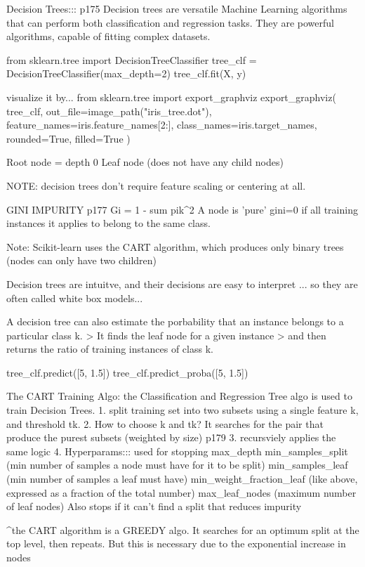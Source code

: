 Decision Trees::: p175
Decision trees are versatile Machine Learning algorithms
that can perform both classification and regression tasks.
They are powerful algorithms, capable of fitting complex datasets.

from sklearn.tree import DecisionTreeClassifier
tree_clf = DecisionTreeClassifier(max_depth=2)
tree_clf.fit(X, y)

visualize it by...
from sklearn.tree import export_graphviz
export_graphviz(
    tree_clf,
    out_file=image_path("iris_tree.dot"),
    feature_names=iris.feature_names[2:],
    class_names=iris.target_names,
    rounded=True,
    filled=True
)

Root node = depth 0
Leaf node (does not have any child nodes)

NOTE:
decision trees don't require feature scaling or centering at all.

GINI IMPURITY
p177
Gi = 1 - sum pik^2
A node is 'pure' gini=0
if all training instances it applies to belong to the same class.

Note:
Scikit-learn uses the CART algorithm,
which produces only binary trees (nodes can only have two children)

Decision trees are intuitve,
and their decisions are easy to interpret
... so they are often called white box models...

A decision tree can also estimate the porbability
that an instance belongs to a particular class k.
> It finds the leaf node for a given instance
> and then returns the ratio of training instances of class k.

tree_clf.predict([5, 1.5]) 
tree_clf.predict_proba([5, 1.5])

The CART Training Algo:
the Classification and Regression Tree algo is used to train Decision Trees.
1. split training set into two subsets using a single feature k, and threshold tk.
2. How to choose k and tk?
It searches for the pair that produce the purest subsets (weighted by size)
p179
3. recursviely applies the same logic
4. Hyperparams::: used for stopping
max_depth
min_samples_split (min number of samples a node must have for it to be split)
min_samples_leaf (min number of samples a leaf must have)
min_weight_fraction_leaf (like above, expressed as a fraction of the total number)
max_leaf_nodes (maximum number of leaf nodes)
Also stops if it can't find a split that reduces impurity

^the CART algorithm is a GREEDY algo.
It searches for an optimum split at the top level, then repeats.
But this is necessary due to the exponential increase in nodes

